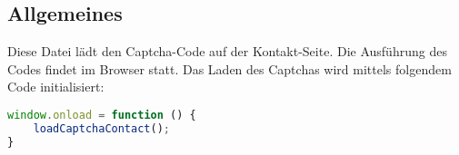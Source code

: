 \subsection{Allgemeines} Diese Datei lädt den Captcha-Code auf der Kontakt-Seite.
Die Ausführung des Codes findet im Browser statt. Das Laden des Captchas wird mittels folgendem Code initialisiert:
\begin{lstlisting}[language=JavaScript]
window.onload = function () {
	loadCaptchaContact();
}
\end{lstlisting}